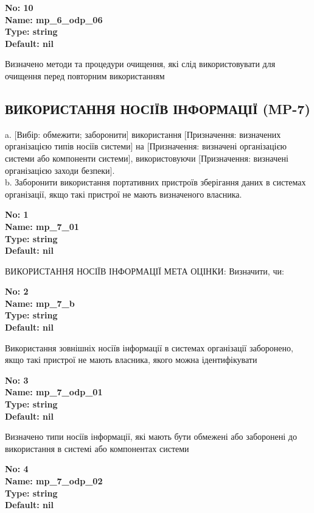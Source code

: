 \documentclass{article}
\begin{document}
{\footnotesize\bfseries
No: 10\\
Name: mp\_\allowbreak{}6\_\allowbreak{}odp\_\allowbreak{}06\\
Type: string\\
Default: nil
}

{\footnotesize Визначено методи та процедури очищення, які слід використовувати для очищення перед повторним використанням}




\subsection{ВИКОРИСТАННЯ НОСІЇВ ІНФОРМАЦІЇ (MP-7)}
a. [Вибір: обмежити; заборонити] використання [Призначення: визначених організацією типів носіїв системи] на [Призначення: визначені організацією системи або компоненти системи], використовуючи [Призначення: визначені організацією заходи безпеки].\\ 
b. Заборонити використання портативних пристроїв зберігання даних в системах організації, якщо такі пристрої не мають визначеного власника.

\vspace{10pt}
{\footnotesize\bfseries
No: 1\\
Name: mp\_\allowbreak{}7\_\allowbreak{}01\\
Type: string\\
Default: nil
}

{\footnotesize ВИКОРИСТАННЯ НОСІЇВ ІНФОРМАЦІЇ МЕТА ОЦІНКИ: Визначити, чи:}


{\footnotesize\bfseries
No: 2\\
Name: mp\_\allowbreak{}7\_\allowbreak{}b\\
Type: string\\
Default: nil
}

{\footnotesize Використання зовнішніх носіїв інформації в системах організації заборонено, якщо такі пристрої не мають власника, якого можна ідентифікувати}


{\footnotesize\bfseries
No: 3\\
Name: mp\_\allowbreak{}7\_\allowbreak{}odp\_\allowbreak{}01\\
Type: string\\
Default: nil
}

{\footnotesize Визначено типи носіїв інформації, які мають бути обмежені або заборонені до використання в системі або компонентах системи}


{\footnotesize\bfseries
No: 4\\
Name: mp\_\allowbreak{}7\_\allowbreak{}odp\_\allowbreak{}02\\
Type: string\\
Default: nil
}
\end{document}
